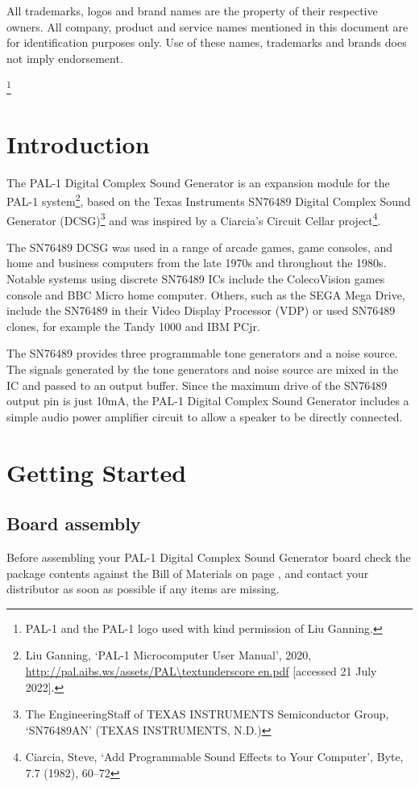 \documentclass[a4paper,11pt,twoside,openright]{report}
\newcommand\mainmatter{
  \cleardoublepage
  \pagenumbering{arabic}}
\begin{document}
All trademarks, logos and brand names are the property of their respective owners. All company, product and service names
mentioned in this document are for identification purposes only. Use of these names, trademarks and brands does not imply 
endorsement.

\thanks{PAL-1 and the PAL-1 logo used with kind permission of Liu Ganning.}
\clearpage
\tableofcontents
\cleardoublepage
\chapter*{Introduction}
The PAL-1 Digital Complex Sound Generator is an expansion module for the PAL-1
system\footnote{Liu Ganning, ‘PAL-1 Microcomputer User Manual’, 2020,  
\url{http://pal.aibs.ws/assets/PAL\textunderscore en.pdf} {[accessed 21 July 2022]}.}, based on the Texas 
Instruments SN76489 Digital Complex Sound Generator (DCSG)\footnote{The EngineeringStaff of TEXAS 
INSTRUMENTS Semiconductor Group, ‘SN76489AN’ (TEXAS INSTRUMENTS, N.D.)} and was inspired by a Ciarcia's
Circuit Cellar project\footnote{Ciarcia, Steve, ‘Add Programmable Sound Effects to Your Computer’, 
Byte, 7.7 (1982), 60–72}. 

The SN76489 DCSG was used in a range of arcade games, game consoles, and home and business computers 
from the late 1970s and throughout the 1980s. Notable systems using discrete SN76489 ICs include the 
ColecoVision games console and BBC Micro home computer. Others, such as the SEGA Mega Drive, include 
the SN76489 in their Video Display Processor (VDP) or used SN76489 clones, for example the Tandy 1000 
and IBM PCjr.

The SN76489 provides three programmable tone generators and a noise source. The signals generated by 
the tone generators and noise source are mixed in the IC and passed to an output buffer. Since the 
maximum drive of the SN76489 output pin is just 10mA, the PAL-1 Digital Complex Sound Generator 
includes a simple audio power amplifier circuit to allow a speaker to be directly connected.

\mainmatter
\chapter{Getting Started}
\section*{Board assembly}
Before assembling your PAL-1 Digital Complex Sound Generator board check the package contents against the 
Bill of Materials on page \pageref{sec:bom}, and contact your distributor as soon as possible if any 
items are missing.
\end{document}
